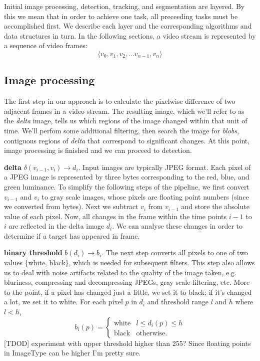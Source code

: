 \documentclass[letter]{article}
\begin{document}
Initial image processing, detection, tracking, and segmentation are layered. By this 
we mean that in order to achieve one task, all preceeding tasks must be accomplished first. 
We describe each layer and the corresponding algorithms and data structures in turn. 
In the following sections, a video stream is represented by a sequence of video frames:
$$ \langle v_0, v_1, v_2, \dots v_{n-1}, v_n \rangle $$

\subsection{Image processing}
The first step in our approach is to calculate the pixelwise difference of two
adjacent frames in a video stream. The resulting image, which we'll refer to as
the \textit{delta} image, tells us which regions of the image changed within that 
unit of time. We'll perfom some additional filtering, then search the image for 
\textit{blobs}, contiguous regions of \textit{delta} that correspond to significant 
changes. At this point, image processing is finished and we can proceed to detection. 

 \textbf{delta} $\delta(v_{i-1}, v_i) \rightarrow d_i$. Input images are typically JPEG 
format. Each pixel of a JPEG image is represented by three bytes corresponding 
to the red, blue, and green luminance. To simplify the following steps of the 
pipeline, we first convert $v_{i-1}$ and $v_i$ to gray scale images, whose pixels
are floating point numbers (since we converted from bytes). Next we subtract 
$v_{i}$ from $v_{i-1}$ and store the absolute value of each pixel. Now, all changes in 
the frame within the time points $i-1$ to $i$ are reflected in the delta image $d_i$. 
We can analyse these changes in order to determine if a target has appeared in frame. 
 
 \textbf{binary threshold} $b(d_i) \rightarrow b_i$. The next step converts all pixels 
to one of two values \{white, black\}, which is needed for subsequent filters. 
This step also allows us to deal with noise artifacts related to the quality of the 
image taken, e.g. bluriness, compressing and decompressing JPEGs, gray scale 
filtering, etc. More to the point, if a pixel has changed just a little, we set it to 
black; if it's changed a lot, we set it to white. For each pixel $p$ in $d_i$ and 
threshold range $l$ and $h$ where $l < h$, 
\[
 b_i(p) = \left \{
  \begin{array}{ll}
    \textrm{white} & l \le d_i(p) \le h \\
    \textrm{black} & \textrm{otherwise.}
  \end{array} \right.
\] 
[TDOD] experiment with upper threshold higher than 255? Since floating points 
in ImageType can be higher I'm pretty sure. 
\end{document}
